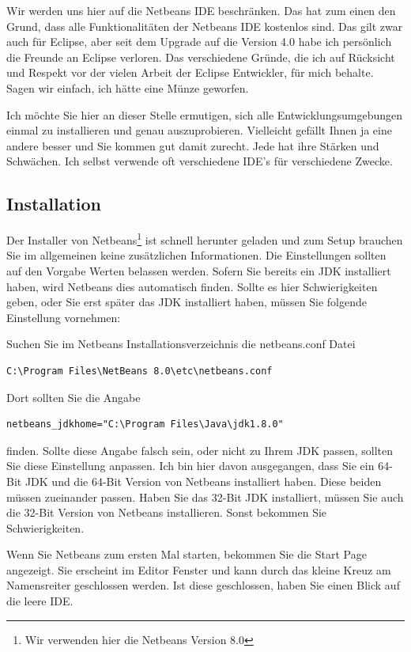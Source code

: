 Wir werden uns hier auf die Netbeans IDE beschränken. Das hat zum einen den Grund, dass alle Funktionalitäten der Netbeans IDE kostenlos sind. Das gilt zwar auch für Eclipse, aber seit dem Upgrade auf die Version 4.0 habe ich persönlich die Freunde an Eclipse verloren. Das verschiedene Gründe, die ich auf Rücksicht und Respekt vor der vielen Arbeit der Eclipse Entwickler, für mich behalte. Sagen wir einfach, ich hätte eine Münze geworfen.

Ich möchte Sie hier an dieser Stelle ermutigen, sich alle Entwicklungsumgebungen einmal zu installieren und genau auszuprobieren. Vielleicht gefällt Ihnen ja eine andere besser und Sie kommen gut damit zurecht. Jede hat ihre Stärken und Schwächen. Ich selbst verwende oft verschiedene IDE's für verschiedene Zwecke.

\subsection{Installation}
Der Installer von Netbeans\footnote{Wir verwenden hier die Netbeans Version 8.0} ist schnell herunter geladen und zum Setup brauchen Sie im allgemeinen keine zusätzlichen Informationen. Die Einstellungen sollten auf den Vorgabe Werten belassen werden. Sofern Sie bereits ein JDK installiert haben, wird Netbeans dies automatisch finden. Sollte es hier Schwierigkeiten geben, oder Sie erst später das JDK installiert haben, müssen Sie folgende Einstellung vornehmen:

Suchen Sie im Netbeans Installationsverzeichnis die netbeans.conf Datei
\begin{Verbatim}
C:\Program Files\NetBeans 8.0\etc\netbeans.conf
\end{Verbatim}
Dort sollten Sie die Angabe
\begin{Verbatim}
netbeans_jdkhome="C:\Program Files\Java\jdk1.8.0"
\end{Verbatim}
finden. Sollte diese Angabe falsch sein, oder nicht zu Ihrem JDK passen, sollten Sie diese Einstellung anpassen.
Ich bin hier davon ausgegangen, dass Sie ein 64-Bit JDK und die 64-Bit Version von Netbeans installiert haben. Diese beiden müssen zueinander passen. Haben Sie das 32-Bit JDK installiert, müssen Sie auch die 32-Bit Version von Netbeans installieren. Sonst bekommen Sie Schwierigkeiten.

Wenn Sie Netbeans zum ersten Mal starten, bekommen Sie die Start Page angezeigt. Sie erscheint im Editor Fenster und kann durch das kleine Kreuz am Namensreiter geschlossen werden. Ist diese geschlossen, haben Sie einen Blick auf die leere IDE. 

